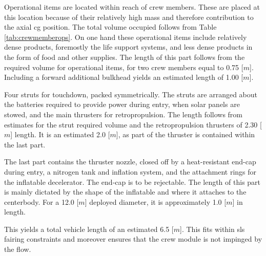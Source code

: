 Operational items are located within reach of crew members. These are placed at this location because of their relatively high mass and therefore contribution to the axial \gls{cg} position. The total volume occupied follows from Table \ref{tab:crewmemberops}. On one hand these operational items include relatively dense products, foremostly the life support systems, and less dense products in the form of food and other supplies.  The length of this part follows from the required volume for operational items, for two crew members equal to 0.75 [$m$]. Including a forward additional bulkhead yields an estimated length of 1.00 [$m$].


Four struts for touchdown, packed symmetrically. The struts are arranged about the batteries required to provide power during entry, when solar panels are stowed, and the main thrusters for retropropulsion. The length follows from estimates for the strut required volume and the retropropulsion thrusters of 2.30 [$m$] length. It is an estimated 2.0 [$m$], as part of the thruster is contained within the last part.

The last part contains the thruster nozzle, closed off by a heat-resistant end-cap during entry, a nitrogen tank and inflation system, and the attachment rings for the inflatable decelerator. The end-cap is to be rejectable. The length of this part is mainly dictated by the shape of the inflatable and where it attaches to the centerbody. For a 12.0 [$m$] deployed diameter, it is approximately 1.0 [$m$] in length.

This yields a total vehicle length of an estimated 6.5 [$m$]. This fits within \gls{sls} fairing constraints  and moreover ensures that the crew module is not impinged by the flow.

